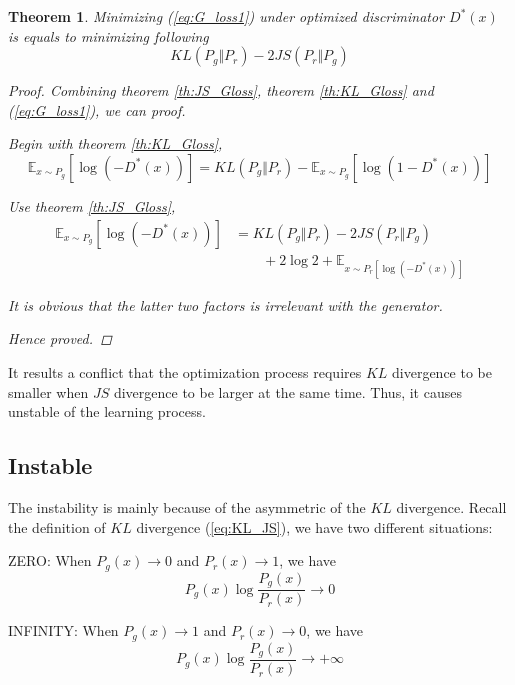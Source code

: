 \documentclass[a4paper]{article}
\newtheorem{theorem}{Theorem}[section]
\begin{document}
\begin{theorem}
    Minimizing (\ref{eq:G_loss1}) under optimized discriminator $D^*(x)$ is equals to minimizing following
    \begin{equation}
        KL(P_g \Vert P_r) - 2 JS(P_r \Vert P_g)
    \end{equation}

    \begin{proof}
        Combining theorem \ref{th:JS_Gloss}, theorem \ref{th:KL_Gloss} and (\ref{eq:G_loss1}), we can proof.

        Begin with theorem \ref{th:KL_Gloss},
        \begin{equation*}
            \mathbb{E}_{x\sim P_g}[\log {(-D^*(x))}]
            = KL(P_g \Vert P_r)
            - \mathbb{E}_{x\sim P_g}[\log {(1-D^*(x))}]
        \end{equation*}

        Use theorem \ref{th:JS_Gloss},
        \begin{equation*}
            \begin{aligned}
                \mathbb{E}_{x\sim P_g}[\log {(-D^*(x))}]
                 & = KL(P_g \Vert P_r) - 2 JS(P_r \Vert P_g)                     \\
                 & \qquad + 2 \log{2} + \mathbb{E}_{x\sim P_r[\log {(-D^*(x))}]}
            \end{aligned}
        \end{equation*}

        It is obvious that the latter two factors is irrelevant with the generator.

        Hence proved.
    \end{proof}

\end{theorem}

It results a conflict that the optimization process requires $KL$ divergence to be smaller when $JS$ divergence to be larger at the same time.
Thus, it causes unstable of the learning process.

\subsection{Instable}
The instability is mainly because of the asymmetric of the $KL$ divergence.
Recall the definition of $KL$ divergence (\ref{eq:KL_JS}), we have two different situations:


\item ZERO:
When $P_g(x) \rightarrow 0$ and $P_r(x) \rightarrow 1$, we have
\begin{equation*}
    P_g(x) \log \frac{P_g(x)}{P_r(x)} \rightarrow 0
\end{equation*}

\item INFINITY:
When $P_g(x) \rightarrow 1$ and $P_r(x) \rightarrow 0$, we have
\begin{equation*}
    P_g(x) \log \frac{P_g(x)}{P_r(x)} \rightarrow +\infty
\end{equation*}
\end{document}
